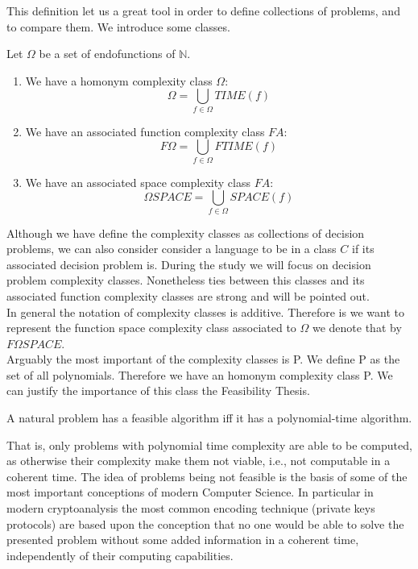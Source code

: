 This definition let us a great tool in order to define collections of problems, and to compare them. We introduce some classes.
\begin{definition}
  Let $\Omega$ be a set of endofunctions of $\mathbb{N}$.
  \begin{enumerate}
  \item We have a homonym complexity class $\Omega$:
  $$\Omega =  \bigcup_{f \in \Omega} TIME(f) $$
  \item We have an associated function complexity class $FA$:
    $$F\Omega =  \bigcup_{f \in \Omega} FTIME(f)$$
  \item We have an associated space complexity class $FA$:
    $$\Omega SPACE =  \bigcup_{f \in \Omega} SPACE(f)$$  \end{enumerate}
\end{definition}


Although we have define the complexity classes as collections of decision problems, we can also consider consider a language to be in a class $C$ if its associated decision problem is. During the study we will focus on decision problem complexity classes. Nonetheless ties between this classes and its associated function complexity classes are strong and will be pointed out.\\

In general the notation of complexity classes is additive. Therefore is we want to represent the function space complexity class associated to $\Omega$ we denote that by $F\Omega SPACE$.\\


Arguably the most important of the complexity classes is P. We define P as the set of all polynomials. Therefore we have an homonym complexity class P. We can justify the importance of this class the Feasibility Thesis.

\begin{thesis}
A natural problem has a feasible algorithm iff it has a polynomial-time algorithm.
\end{thesis}

That is, only problems with polynomial time complexity are able to be computed, as otherwise their complexity make them not viable, i.e., not computable in a coherent time. The idea of problems being not feasible is the basis of some of the most important conceptions of modern Computer Science. In particular in modern cryptoanalysis the most common encoding technique (private keys protocols) are based upon the conception that no one would be able to solve the presented problem without some added information in a coherent time, independently of their computing capabilities.\\





